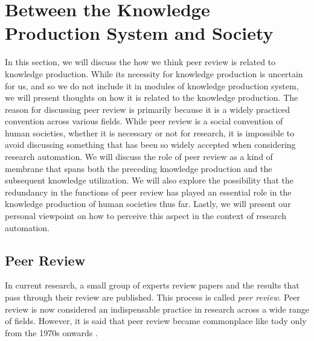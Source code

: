 \documentclass{book}
\begin{document}



\section{Between the Knowledge Production System and Society}
In this section, we will discuss the how we think peer review is related to knowledge production. While its necessity for knowledge production is uncertain for us, and so we do not include it in modules of knowledge production system, we will present thoughts on how it is related to the knowledge production. The reason for discussing peer review is primarily because it is a widely practiced convention across various fields. While peer review is a social convention of human societies, whether it is necessary or not for research, it is impossible to avoid discussing something that has been so widely accepted when considering research automation. We will discuss the role of peer review as a kind of membrane that spans both the preceding knowledge production and the subsequent knowledge utilization. We will also explore the possibility that the redundancy in the functions of peer review has played an essential role in the knowledge production of human societies thus far. Lastly, we will present our personal viewpoint on how to perceive this aspect in the context of research automation.

\subsection{Peer Review}
In current research, a small group of experts review papers and the results that pass through their review are published. This process is called \textit{peer review}. Peer review is now considered an indispensable practice in research across a wide range of fields. However, it is said that peer review became commonplace like tody only from the 1970s onwards \cite{baldwin2018scientific}.
\end{document}
